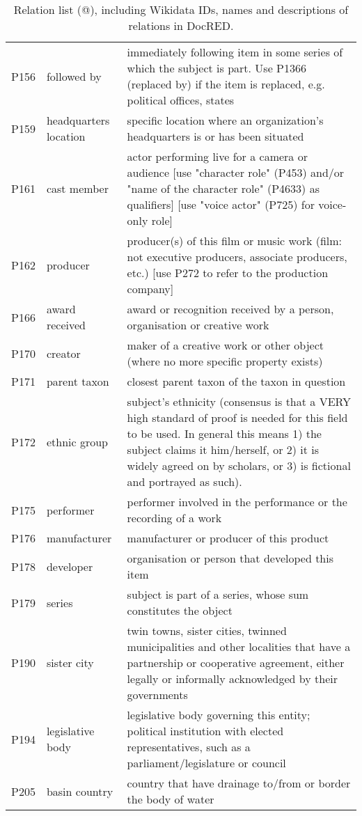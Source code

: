 \documentclass[11pt,a4paper]{article}
\makeatletter
\newcommand{\Rmnum}[1]{\expandafter\@slowromancap\romannumeral #1@}
\makeatother
\begin{document}
\begin{table*}[htp]
{\begin{tabular}{p{} | p{} | p{}}
P156 & followed by & immediately following item in some series of which the subject is part. Use P1366 (replaced by) if the item is replaced, e.g. political offices, states \\
P159 & headquarters location & specific location where an organization's headquarters is or has been situated \\
P161 & cast member & actor performing live for a camera or audience [use "character role" (P453) and/or "name of the character role" (P4633) as qualifiers] [use "voice actor" (P725) for voice-only role] \\
P162 & producer & producer(s) of this film or music work (film: not executive producers, associate producers, etc.) [use P272 to refer to the production company] \\
P166 & award received & award or recognition received by a person, organisation or creative work \\
P170 & creator & maker of a creative work or other object (where no more specific property exists) \\
P171 & parent taxon & closest parent taxon of the taxon in question \\
P172 & ethnic group & subject's ethnicity (consensus is that a VERY high standard of proof is needed for this field to be used. In general this means 1) the subject claims it him/herself, or 2) it is widely agreed on by scholars, or 3) is fictional and portrayed as such). \\
P175 & performer & performer involved in the performance or the recording of a work \\
P176 & manufacturer & manufacturer or producer of this product \\
P178 & developer & organisation or person that developed this item \\
P179 & series & subject is part of a series, whose sum constitutes the object \\
P190 & sister city & twin towns, sister cities, twinned municipalities and other localities that have a partnership or cooperative agreement, either legally or informally acknowledged by their governments \\
P194 & legislative body & legislative body governing this entity; political institution with elected representatives, such as a parliament/legislature or council \\
P205 & basin country & country that have drainage to/from or border the body of water \\

\bottomrule

\end{tabular}
}
\caption{Relation list (\Rmnum{1}), including Wikidata IDs, names and descriptions of relations in DocRED.}
 \label{table:relation list1}

\end{table*}
\end{document}
